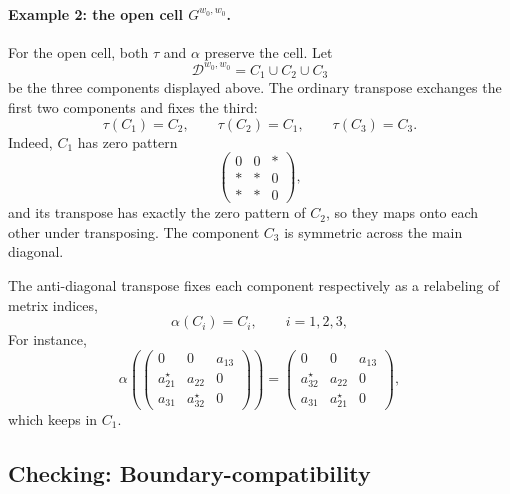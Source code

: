 \documentclass[12pt]{amsart}
\theoremstyle{plain}
\theoremstyle{definition}
\theoremstyle{remark}
\begin{document}
\bigskip

\paragraph{\bf Example 2: the open cell $G^{w_0,w_0}$.}
For the open cell, both $\tau$ and $\alpha$ preserve the cell. Let
\begin{equation*}
   \mathcal D^{w_0,w_0}=C_1\cup C_2\cup C_3
\end{equation*}
be the three components displayed above. The ordinary transpose exchanges the
first two components and fixes the third:
\begin{equation*}
   \tau(C_1)=C_2,\qquad
   \tau(C_2)=C_1,\qquad
   \tau(C_3)=C_3.
\end{equation*}
Indeed, $C_1$ has zero pattern
\begin{equation*}
\begin{pmatrix}
0&0&\ast\\
\ast&\ast&0\\
\ast&\ast&0
\end{pmatrix},
\end{equation*}
and its transpose has exactly the zero pattern of $C_2$, so they maps onto each other under transposing. The component $C_3$ is symmetric across
the main diagonal. 


\bigskip

The anti-diagonal transpose fixes each component respectively as a relabeling of metrix indices,
\begin{equation*}
   \alpha(C_i)=C_i,\qquad i=1,2,3,
\end{equation*}
For instance,
\begin{equation*}
\alpha\!\left(
\begin{pmatrix}
0&0&a_{13}\\
a_{21}^{\star}&a_{22}&0\\
a_{31}&a_{32}^{\star}&0
\end{pmatrix}
\right)
=
\begin{pmatrix}
0&0&a_{13}\\
a_{32}^{\star}&a_{22}&0\\
a_{31}&a_{21}^{\star}&0
\end{pmatrix},
\end{equation*}
which keeps in $C_1$.


\subsection{Checking: Boundary-compatibility}
\end{document}
